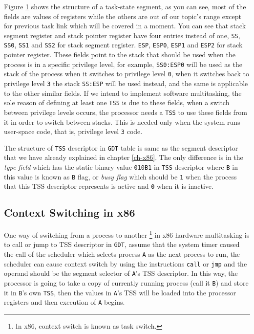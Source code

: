 Figure \protect\hyperlink{fig:tss}{1} shows the structure of a
task-state segment, as you can see, most of the fields are values of
registers while the others are out of our topic's range except for
previous task link which will be covered in a moment. You can see that
stack segment register and stack pointer register have four entries
instead of one, \lstinline!SS!, \lstinline!SS0!, \lstinline!SS1! and
\lstinline!SS2! for stack segment register. \lstinline!ESP!,
\lstinline!ESP0!, \lstinline!ESP1! and \lstinline!ESP2! for stack
pointer register. These fields point to the stack that should be used
when the process is in a specific privilege level, for example,
\lstinline!SS0:ESP0! will be used as the stack of the process when it
switches to privilege level \lstinline!0!, when it switches back to
privilege level \lstinline!3! the stack \lstinline!SS:ESP! will be used
instead, and the same is applicable to the other similar fields. If we
intend to implement software multitasking, the sole reason of defining
at least one \lstinline!TSS! is due to these fields, when a switch
between privilege levels occurs, the processor needs a \lstinline!TSS!
to use these fields from it in order to switch between stacks. This is
needed only when the system runs user-space code, that is, privilege
level \lstinline!3! code.

The structure of \lstinline!TSS! descriptor in \lstinline!GDT! table is
same as the segment descriptor that we have already explained in chapter
\ref{ch-x86}. The only difference is in the \emph{type field} which has
the static binary value \lstinline!010B1! in \lstinline!TSS! descriptor
where \lstinline!B! in this value is known as \lstinline!B! flag, or
\emph{busy flag} which should be \lstinline!1! when the process that
this TSS descriptor represents is active and \lstinline!0! when it is
inactive.

\subsection{Context Switching in x86}\label{context-switching-in-x86}

One way of switching from a process to another \footnote{In x86, context
  switch is known as task switch.} in x86 hardware multitasking is to
call or jump to TSS descriptor in \lstinline!GDT!, assume that the
system timer caused the call of the scheduler which selects process
\lstinline!A! as the next process to run, the scheduler can cause
context switch by using the instructions \lstinline!call! or
\lstinline!jmp! and the operand should be the segment selector of
\lstinline!A!'s TSS descriptor. In this way, the processor is going to
take a copy of currently running process (call it \lstinline!B!) and
store it in \lstinline!B!'s own \lstinline!TSS!, then the values in
\lstinline!A!'s TSS will be loaded into the processor registers and then
execution of \lstinline!A! begins.

